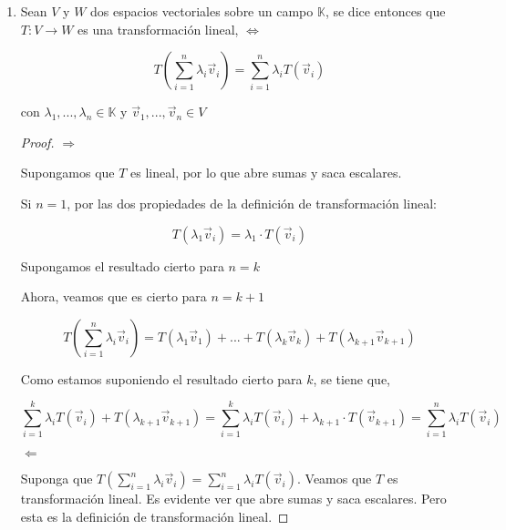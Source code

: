 \documentclass[12pt]{article}
\newcommand\K{\ensuremath{\mathbb{K}}}
\begin{document}
\begin{enumerate} 

\item Sean $V$ y $W$ dos espacios vectoriales sobre un campo $\K$, se dice entonces que $T : V \to W$ es una transformación lineal, $\Leftrightarrow$

$$T \left( \sum_{i=1}^{n} \lambda_i {\vec{v}}_{i} \right) =  \sum_{i=1}^{n}\lambda_i  T\left( {\vec{v}}_{i} \right)$$

con $\lambda_1, ..., \lambda_n \in \K$ y ${\vec{v}}_{1}, ..., {\vec{v}}_{n} \in V$

\begin{proof}
$\Rightarrow$

Supongamos que $T$ es lineal, por lo que abre sumas y saca escalares. 

Si $n=1$, por las dos propiedades de la definición de transformación lineal:

$$T(\lambda_1 {\vec{v}}_{i} ) = \lambda_1 \cdot T({\vec{v}}_{i})$$

Supongamos el resultado cierto para $n=k$

Ahora, veamos que es cierto para $n = k + 1$

$$T \left( \sum_{i=1}^{n} \lambda_i {\vec{v}}_{i} \right) = T \left( \lambda_1 {\vec{v}}_{1} \right) + ... + T\left( \lambda_k {\vec{v}}_{k} \right) + T\left( \lambda_{k+1} {\vec{v}}_{k+1} \right) $$

Como estamos suponiendo el resultado cierto para $k$, se tiene que,

$$ \sum_{i=1}^{k}\lambda_i  T\left( {\vec{v}}_{i} \right)  + T\left( \lambda_{k+1} {\vec{v}}_{k+1} \right) = \sum_{i=1}^{k}\lambda_i  T\left( {\vec{v}}_{i} \right) + \lambda_{k+1}  \cdot T\left( {\vec{v}}_{k+1}  \right) = \sum_{i=1}^{n}\lambda_i  T\left( {\vec{v}}_{i} \right)$$

$\Leftarrow$

Suponga que $T \left( \sum\limits_{i=1}^{n} \lambda_i {\vec{v}}_{i} \right) =  \sum\limits_{i=1}^{n}\lambda_i  T\left( {\vec{v}}_{i} \right)$. Veamos que $T$ es transformación lineal. Es evidente ver que abre sumas y saca escalares. Pero esta es la definición de transformación lineal. 
\end{proof}

\end{enumerate}
\end{document}

